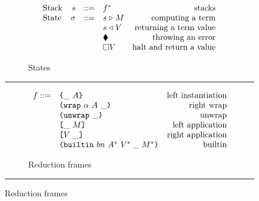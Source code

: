 \begin{figure}[!ht]
\caption{The CK machine}\label{fig:ck-machine}
\centering
\begin{subfigure}[c]{\linewidth}  %
{\small
\caption{States}
    \[\begin{array}{lrclr}
        \textrm{Stack} & s      & ::= & f^*                               & \textrm{stacks}\\
        \textrm{State} & \sigma & ::= & s \mathrel\triangleright M                  & \textrm{computing a term}\\
                       &        &     & s \mathrel\triangleleft V                 & \textrm{returning a term value}\\
                       &        &     & \blacklozenge{}                        & \textrm{throwing an error}\\
                       &        &     & \square V                        & \textrm{halt and return a value}
    \end{array}\]
}
\end{subfigure}

\vspace{3mm}
\hrule
\vspace{3mm}

\begin{subfigure}[c]{\linewidth}      %
{\small
\caption{Reduction frames}
\[
    \begin{array}{rlr}
      f ::= & \texttt{\{}\_ ~ A\texttt{\}}                     & \textrm{left instantiation}\\
            & \texttt{(} \texttt{wrap} ~ \alpha ~ A ~ \_ \texttt{)}            & \textrm{right wrap}\\
            & \texttt{(} \texttt{unwrap} ~ \_ \texttt{)}{}                        & \textrm{unwrap}\\
            & \texttt{[} \_ ~ M \texttt{]}                      & \textrm{left application}\\
            & \texttt{[} V ~ \_ \texttt{]}                     & \textrm{right application}\\
            & \texttt{(} \texttt{builtin} ~ bn ~ A^* ~ V^*\; \_\; M^* \texttt{)}        & \textrm{builtin}\\
    \end{array}
\]
}
\end{subfigure}
\vspace{3mm}
\hrule
\vspace{3mm}


\end{figure}

